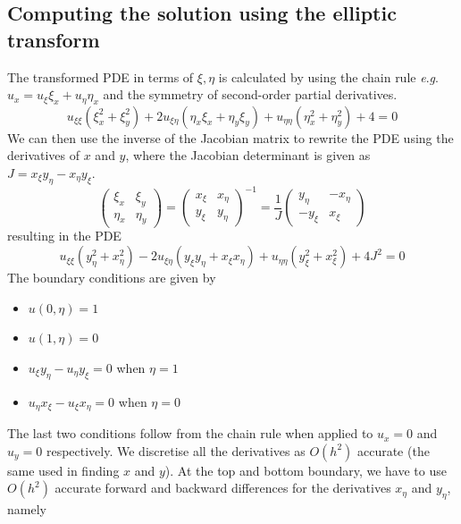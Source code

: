 \documentclass{article}
\numberwithin{equation}{section}
\theoremstyle{definition}
\newcommand{\eg}{\textit{e}.\textit{g}. }
\begin{document}
\subsection{Computing the solution using the elliptic transform}
The transformed PDE in terms of $\xi,\eta$ is calculated by using the chain rule \eg $u_x = u_\xi \xi_x + u_\eta \eta_x$ and the symmetry of second-order partial derivatives.
\begin{equation}
    u_{\xi\xi}(\xi_x^2 + \xi_y^2) + 2u_{\xi\eta}(\eta_x \xi_x + \eta_y \xi_y) + u_{\eta\eta} (\eta_x^2 + \eta_y^2) + 4 = 0
\end{equation}
We can then use the inverse of the Jacobian matrix to rewrite the PDE using the derivatives of $x$ and $y$, where the Jacobian determinant is given as $J = x_{\xi}y_{\eta} - x_{\eta}y_{\xi}$.
\begin{equation}
\begin{pmatrix}
    \xi_{x} & \xi_{y}\\
    \eta_{x} & \eta_{y}
    \end{pmatrix} =
    \begin{pmatrix}
    x_{\xi} & x_{\eta}\\ 
    y_{\xi} & y_{\eta}
    \end{pmatrix}^{-1} =
    \frac {1}{J}
    \begin{pmatrix}
    y_{\eta} & -x_{\eta}\\ 
    -y_{\xi} & x_{\xi}
    \end{pmatrix}
\end{equation}
resulting in the PDE
\begin{equation}
    u_{\xi\xi}(y_{\eta}^2 + x_{\eta}^2) - 2u_{\xi\eta}(y_\xi y_\eta + x_\xi x_\eta) + u_{\eta\eta} (y_{\xi}^2 + x_{\xi}^2) + 4J^2 = 0
\end{equation}
The boundary conditions are given by
\begin{itemize}
    \item $u(0,\eta) = 1$
    \item $u(1,\eta) = 0$
    \item $u_{\xi} y_{\eta} - u_{\eta} y_{\xi} = 0$ when $\eta=1$
    \item $u_{\eta} x_{\xi} - u_{\xi} x_{\eta} = 0$ when $\eta=0$
\end{itemize}
The last two conditions follow from the chain rule when applied to $u_x = 0$ and $u_y=0$ respectively. We discretise all the derivatives as $O(h^2)$ accurate (the same used in finding $x$ and $y$). At the top and bottom boundary, we have to use $O(h^2)$ accurate forward and backward differences for the derivatives $x_{\eta}$ and $y_{\eta}$, namely
\end{document}
